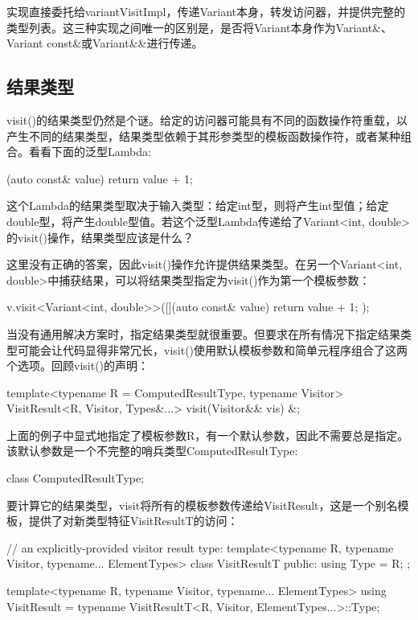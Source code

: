 实现直接委托给variantVisitImpl，传递Variant本身，转发访问器，并提供完整的类型列表。这三种实现之间唯一的区别是，是否将Variant本身作为Variant\&、Variant const\&或Variant\&\&进行传递。

\subsection{结果类型}

visit()的结果类型仍然是个谜。给定的访问器可能具有不同的函数操作符重载，以产生不同的结果类型，结果类型依赖于其形参类型的模板函数操作符，或者某种组合。看看下面的泛型Lambda:

\begin{cpp}
[](auto const& value) {
	return value + 1;
}
\end{cpp}

这个Lambda的结果类型取决于输入类型：给定int型，则将产生int型值；给定double型，将产生double型值。若这个泛型Lambda传递给了Variant<int, double>的visit()操作，结果类型应该是什么？

这里没有正确的答案，因此visit()操作允许提供结果类型。在另一个Variant<int, double>中捕获结果，可以将结果类型指定为visit()作为第一个模板参数：

\begin{cpp}
v.visit<Variant<int, double>>([](auto const& value) {
								return value + 1;
							});
\end{cpp}

当没有通用解决方案时，指定结果类型就很重要。但要求在所有情况下指定结果类型可能会让代码显得非常冗长，visit()使用默认模板参数和简单元程序组合了这两个选项。回顾visit()的声明：

\begin{cpp}
template<typename R = ComputedResultType, typename Visitor>
VisitResult<R, Visitor, Types&...> visit(Visitor&& vis) &;
\end{cpp}

上面的例子中显式地指定了模板参数R，有一个默认参数，因此不需要总是指定。该默认参数是一个不完整的哨兵类型ComputedResultType:

\begin{cpp}
class ComputedResultType;
\end{cpp}

要计算它的结果类型，visit将所有的模板参数传递给VisitResult，这是一个别名模板，提供了对新类型特征VisitResultT的访问：

\begin{cpp}
// an explicitly-provided visitor result type:
template<typename R, typename Visitor, typename... ElementTypes>
class VisitResultT {
	public:
	using Type = R;
};

template<typename R, typename Visitor, typename... ElementTypes>
using VisitResult =
typename VisitResultT<R, Visitor, ElementTypes...>::Type;
\end{cpp}

